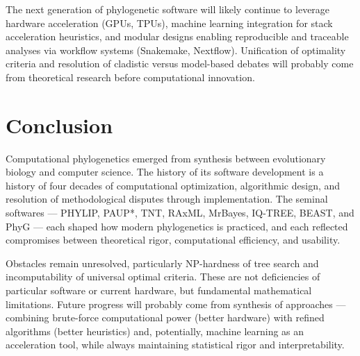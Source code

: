 The next generation of phylogenetic software will likely continue to leverage hardware acceleration (GPUs, TPUs), machine learning integration for stack acceleration heuristics, and modular designs enabling reproducible and traceable analyses via workflow systems (Snakemake, Nextflow). Unification of optimality criteria and resolution of cladistic versus model-based debates will probably come from theoretical research before computational innovation.

\section{Conclusion}

Computational phylogenetics emerged from synthesis between evolutionary biology and computer science. The history of its software development is a history of four decades of computational optimization, algorithmic design, and resolution of methodological disputes through implementation. The seminal softwares --- PHYLIP, PAUP*, TNT, RAxML, MrBayes, IQ-TREE, BEAST, and PhyG --- each shaped how modern phylogenetics is practiced, and each reflected compromises between theoretical rigor, computational efficiency, and usability.

Obstacles remain unresolved, particularly NP-hardness of tree search and incomputability of universal optimal criteria. These are not deficiencies of particular software or current hardware, but fundamental mathematical limitations. Future progress will probably come from synthesis of approaches --- combining brute-force computational power (better hardware) with refined algorithms (better heuristics) and, potentially, machine learning as an acceleration tool, while always maintaining statistical rigor and interpretability.

